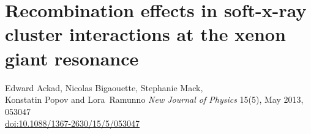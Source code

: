 

\newcommand{\PaperTitleRecomb}{Recombination effects in soft-x-ray cluster interactions at the xenon giant resonance}

\section{\PaperTitleRecomb}
\label{section:papers:recomb}

\begin{flushright}
Edward Ackad, Nicolas Bigaouette, Stephanie Mack, \\
Konstatin Popov and Lora~Ramunno
\textit{New Journal of Physics} 15(5), May 2013, 053047\\
\href{http://dx.doi.org/10.1088/1367-2630/15/5/053047}{doi:10.1088/1367-2630/15/5/053047}
\end{flushright}

\HidePDFTwoNumbers


